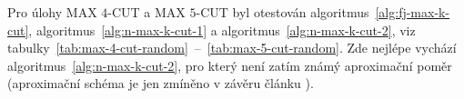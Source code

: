 \begin{table}[h!]
    \begin{center}
    \end{center}
    \caption{MAX $3$-CUT na náhodných grafech řádu $30$.}
    \label{tab:max-3-cut-random}
\end{table}

Pro úlohy MAX $4$-CUT a MAX $5$-CUT byl otestován algoritmus~\ref{alg:fj-max-k-cut}, algoritmus~\ref{alg:n-max-k-cut-1} a algoritmus~\ref{alg:n-max-k-cut-2}, viz tabulky~\ref{tab:max-4-cut-random}~--~\ref{tab:max-5-cut-random}. Zde nejlépe vychází algoritmus~\ref{alg:n-max-k-cut-2}, pro který není zatím známý aproximační poměr (aproximační schéma je jen zmíněno v závěru článku \cite{newman}).

